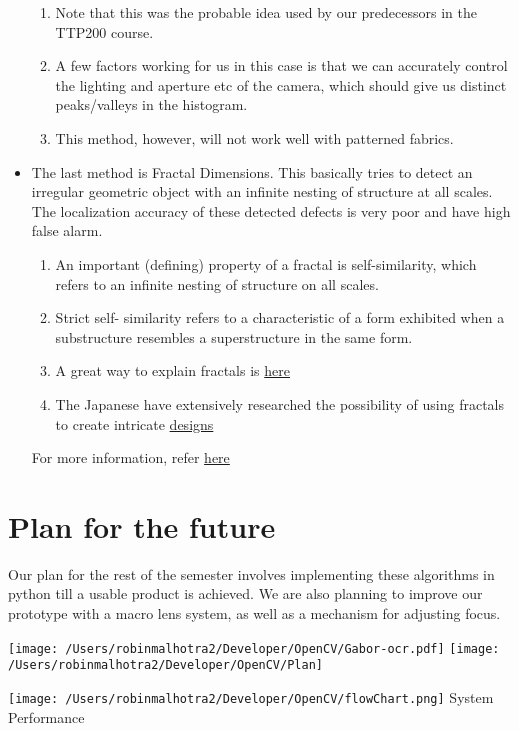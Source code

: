 \documentclass[DIV=calc, paper=a4, fontsize=12pt, twocolumn]{scrartcl}	 %
\begin{document}
\begin{itemize}
\begin{enumerate}
\item Note that this was the probable idea used by our predecessors in the TTP200 course. 
\item A few factors working for us in this case is that we can accurately control the lighting and aperture etc of the camera, which should give us distinct peaks/valleys in the histogram.
\item This method, however, will not work well with patterned fabrics.
\end{enumerate}

\item The last method is Fractal Dimensions. This basically tries to detect an irregular geometric object with an infinite nesting of structure at all scales. The localization accuracy of these detected defects is very poor and have high false alarm. 

\begin{enumerate}
\item An important (defining) property of a fractal is self-similarity, which refers to an infinite nesting of structure on all scales. 
\item Strict self- similarity refers to a characteristic of a form exhibited when a substructure resembles a superstructure in the same form.
\item A great way to explain fractals is \href{http://www.shodor.org/master/fractal/software/Snowflake.html#HELPLIST}{here}
\item The Japanese have extensively researched the possibility of using fractals to create intricate \href{http://www.shodor.org/master/fractal/software/Snowflake.html#HELPLIST}{designs}
\end{enumerate}
For more information, refer \href{http://www.vanderbilt.edu/AnS/psychology/cogsci/chaos/workshop/Fractals.html}{here}
\end{itemize}

\section{Plan for the future}
Our plan for the rest of the semester involves implementing these algorithms in python till a usable product is achieved. We are also planning to improve our prototype with a macro lens system, as well as a mechanism for adjusting focus.
\clearpage

\texttt{[image: /Users/robinmalhotra2/Developer/OpenCV/Gabor-ocr.pdf]}
\texttt{[image: /Users/robinmalhotra2/Developer/OpenCV/Plan]}
\newpage
\clearpage
\begin{center}
 \texttt{[image: /Users/robinmalhotra2/Developer/OpenCV/flowChart.png]}
System Performance
\end{center}
\end{document}
